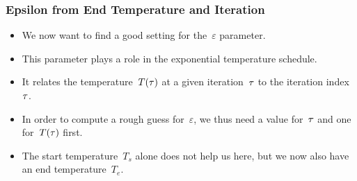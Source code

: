 \documentclass[mathserif]{beamer}%
\begin{document}
\begin{frame}%
\frametitle{Epsilon from End Temperature and Iteration}%
\begin{itemize}%
\item We now want to find a good setting for the~$\varepsilon$ parameter.%
\item<2-> This parameter plays a role in the exponential temperature schedule.%
\item<4-> It relates the temperature~$T(\tau)$ at a given iteration~$\tau$ to the iteration index~$\tau$.%
\item<5-> In order to compute a rough guess for~$\varepsilon$, we thus need a value for~$\tau$ and one for~$T(\tau)$ first.%
\item<6-> The start temperature~$T_s$ alone does not help us here, but we now also have an end temperature~$T_e$.%
\end{itemize}%
%
\end{frame}%
%
\setcounter{equation}{\value{eqLast}}%
%
\end{document}
